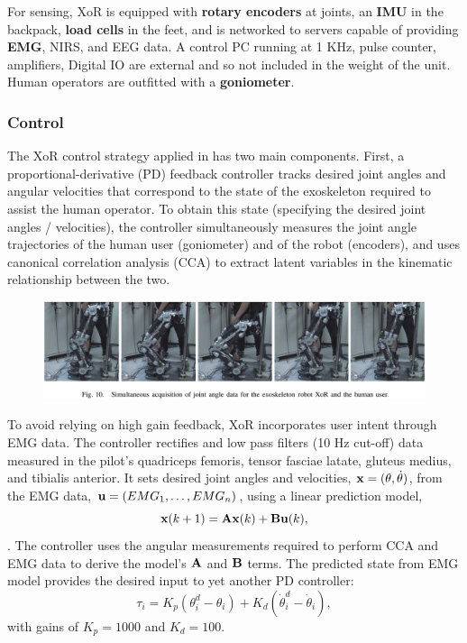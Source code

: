 \begin{refsection}
For sensing, XoR is equipped with \textbf{rotary encoders} at joints, an \textbf{IMU} in the backpack, \textbf{load cells} in the feet, and is networked to servers capable of providing \textbf{EMG}, NIRS, and EEG data.  A control PC running at 1 KHz, pulse counter, amplifiers, Digital IO are external and so not included in the weight of the unit.  Human operators are outfitted with a \textbf{goniometer}.


\subsubsection{Control}

The XoR control strategy applied in \cite{XoRkinemExtraction2012} has two main components.  First, a proportional-derivative (PD) feedback controller tracks desired joint angles and angular velocities that correspond to the state of the exoskeleton required to assist the human operator.  To obtain this state (specifying the desired joint angles / velocities), the controller simultaneously measures the joint angle trajectories of the human user (goniometer) and of the robot (encoders), and uses canonical correlation analysis (CCA) to extract latent variables in the kinematic relationship between the two.

\begin{figure}[ht]
  \centering
  \includegraphics[width=6.0in]{exos/figs/xor_joint_angles.png}
\end{figure}

To avoid relying on high gain feedback, XoR incorporates user intent through EMG data.  The controller rectifies and low pass filters (10 Hz cut-off) data measured in the pilot's quadriceps femoris, tensor fasciae latate, gluteus medius, and tibialis anterior. 
It sets desired joint angles and velocities, ${\bf x} = ({\bf \theta}, \dot{\bf \theta})$, from the EMG data, ${\bf u} = (EMG_1, \dots , EMG_n)$, using a linear prediction model, 
\[{\bf x}(k+1) = {\bf A}{\bf x}(k)+{\bf B}{\bf u}(k),\].  
The controller uses the angular measurements required to perform CCA and EMG data to derive the model's ${\bf A}$ and ${\bf B}$ terms.  The predicted state from EMG model provides the desired input to yet another PD controller: 
\[\tau_i = K_p (\theta_i^d - \theta_i) + K_d (\dot\theta_i^d - \dot \theta_i),\] 
with gains of $K_p = 1000$ and $K_d = 100$.


\end{refsection}
